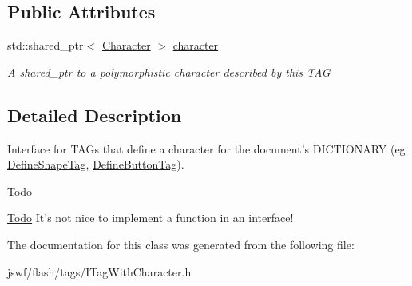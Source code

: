 \subsection*{Public Attributes}
\begin{DoxyCompactItemize}
\item 
\hypertarget{classjswf_1_1flash_1_1tags_1_1_i_tag_with_character_a55bca1ec57dd3539fac676587bde5d80}{std\+::shared\+\_\+ptr$<$ \hyperlink{classjswf_1_1flash_1_1_character}{Character} $>$ \hyperlink{classjswf_1_1flash_1_1tags_1_1_i_tag_with_character_a55bca1ec57dd3539fac676587bde5d80}{character}}\label{classjswf_1_1flash_1_1tags_1_1_i_tag_with_character_a55bca1ec57dd3539fac676587bde5d80}

\begin{DoxyCompactList}\small\item\em A {\ttfamily shared\+\_\+ptr} to a polymorphistic character described by this {\ttfamily T\+A\+G} \end{DoxyCompactList}\end{DoxyCompactItemize}


\subsection{Detailed Description}
Interface for {\ttfamily T\+A\+G}s that define a character for the document's {\ttfamily D\+I\+C\+T\+I\+O\+N\+A\+R\+Y} (eg \hyperlink{classjswf_1_1flash_1_1tags_1_1_define_shape_tag}{Define\+Shape\+Tag}, \hyperlink{classjswf_1_1flash_1_1tags_1_1_define_button_tag}{Define\+Button\+Tag}). 

\begin{DoxyRefDesc}{Todo}
\item[\hyperlink{todo__todo000015}{Todo}]It's not nice to implement a function in an interface! \end{DoxyRefDesc}


The documentation for this class was generated from the following file\+:\begin{DoxyCompactItemize}
\item 
jswf/flash/tags/I\+Tag\+With\+Character.\+h\end{DoxyCompactItemize}
